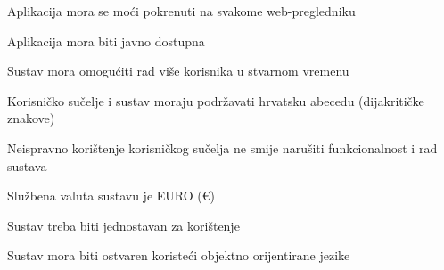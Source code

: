 			
		 
			 \begin{packed_item}
			 	\item Aplikacija mora se moći pokrenuti na svakome web-pregledniku
			 	\item Aplikacija mora biti javno dostupna
			 	\item Sustav mora omogućiti rad više korisnika u stvarnom vremenu
			 	\item Korisničko sučelje i sustav moraju podržavati hrvatsku abecedu (dijakritičke znakove)
			 	\item Neispravno korištenje korisničkog sučelja ne smije narušiti funkcionalnost i rad sustava
			 	\item Službena valuta sustavu je EURO (€)
			 	\item Sustav treba biti jednostavan za korištenje
			 	\item Sustav mora biti ostvaren koristeći objektno orijentirane jezike
			 	
			 	
			 \end{packed_item}
			 
			 
			 
	